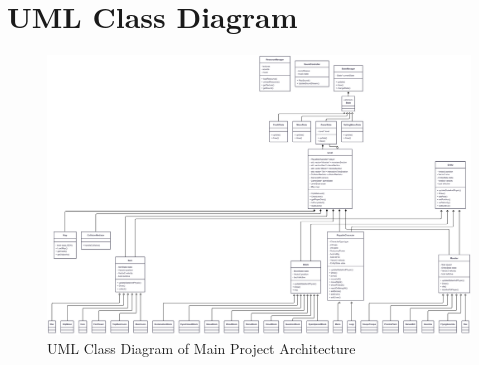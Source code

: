 \clearpage
\section{UML Class Diagram}
\label{sec:uml}

\begin{figure}[H]
    \centering
    \includegraphics[width=\textwidth]{img/class_diagram}
    \caption{UML Class Diagram of Main Project Architecture}
    \label{fig:uml_diagram}
\end{figure}
